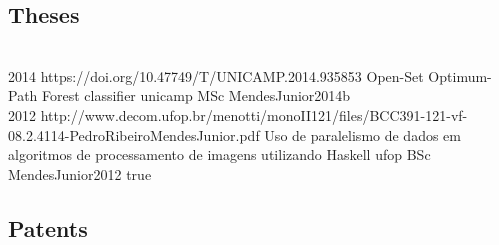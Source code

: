 
\subsection*{Theses}

\begin{publications}
  \\

  {2014}
  {https://doi.org/10.47749/T/UNICAMP.2014.935853}
  {Open-Set Optimum-Path Forest classifier}
  {unicamp}
  {MSc}
  {MendesJunior2014b}
  {}
  \\

  {2012}
  {http://www.decom.ufop.br/menotti/monoII121/files/BCC391-121-vf-08.2.4114-PedroRibeiroMendesJunior.pdf}
  {Uso de paralelismo de dados em algoritmos de processamento de imagens utilizando Haskell}
  {ufop}
  {BSc}
  {MendesJunior2012}
  {true}
  \\

\end{publications}

\subsection*{Patents}


